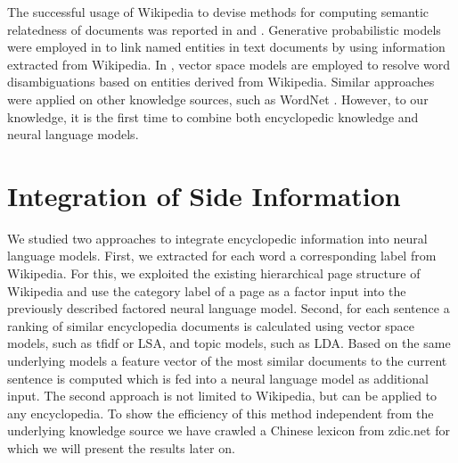 \documentclass[a4paper]{article}
\begin{document}
The successful usage of Wikipedia to devise methods for computing semantic relatedness of documents was reported in \cite{gabrilovich2007computing} and \cite{strube2006wikirelate}.
Generative probabilistic models were employed in \cite{han2012entity} to link named entities in text documents by using information extracted from Wikipedia. 
In \cite{cucerzan2007large},\cite{bunescu2006using} vector space models are employed to resolve word disambiguations based on entities derived from Wikipedia.
Similar approaches were applied on other knowledge sources, such as WordNet \cite{hearst1992automatic}.
However, to our knowledge, it is the first time to combine both encyclopedic knowledge and neural language models.

\section{Integration of Side Information}
We studied two approaches to integrate encyclopedic information into neural language models.
First, we extracted for each word a corresponding label from Wikipedia. For this, we exploited the existing hierarchical page structure of Wikipedia and use the category label of a page as a factor input into the previously described factored neural language model.
Second, for each sentence a ranking of similar encyclopedia documents is calculated using vector space models, such as tfidf or LSA, and topic models, such as LDA. Based on the same underlying models a feature vector of the most similar documents to the current sentence is computed which is fed into a neural language model as additional input. The second approach is not limited to Wikipedia, but can be applied to any encyclopedia. To show the efficiency of this method independent from the underlying knowledge source we have crawled a Chinese lexicon from zdic.net \cite{zdic} for which we will present the results later on. 
\end{document}
